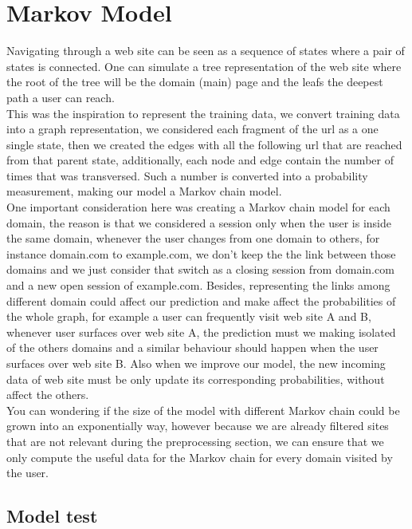 \section{Markov Model}\label{sec:models}

Navigating through a web site can be seen as a sequence of states where a pair of states is connected. One can simulate a tree representation of the web site where the root of the tree will be the domain (main) page and the leafs the deepest path a user can reach.
\\[2ex]
This was the inspiration to represent the training data, we convert training data into a graph representation, we considered each fragment of the url as a one single state, then we created the edges with all the following url that are reached from that parent state, additionally, each node and edge contain the number of times that was transversed.  Such a number is converted into a probability measurement, making our model a Markov chain model.
\\[2ex]
One important consideration here was creating a Markov chain model for each domain, the reason is that we considered a session only when the user is inside the same domain, whenever the user changes from one domain to others, for instance domain.com to example.com, we don’t keep the the link between those domains and we just consider that switch as a closing session from domain.com and a new open session of example.com. Besides, representing the links among different domain could affect our prediction and make affect the probabilities of the whole graph, for example a user can frequently visit web site A and B, whenever user surfaces over web site A, the prediction must we making isolated of the others domains and a similar behaviour should happen when the user surfaces over web site B. Also when we improve our model, the new incoming data of web site must be only update its corresponding probabilities, without affect the others.
\\[2ex]
You can wondering if the size of the model with different Markov chain could be grown into an exponentially way, however because we are already filtered sites that are not relevant during the preprocessing section, we can ensure that we only compute the useful data for the Markov chain for every domain visited by the user.

\subsection{Model test}\label{subsec:model_test}

